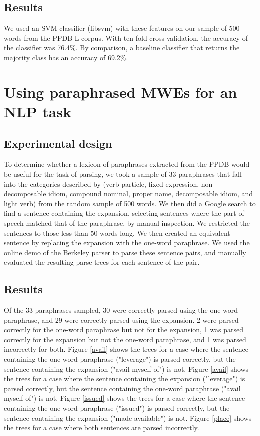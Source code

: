 \documentclass[11pt]{article}
\begin{document}
\subsection{Results}

We used an SVM classifier (libsvm) with these features on our sample of 500 words from the PPDB L corpus. With ten-fold cross-validation, the accuracy of the classifier was 76.4\%. By comparison, a baseline classifier that returns the majority class has an accuracy of 69.2\%. 

\section{Using paraphrased MWEs for an NLP task}

\subsection{Experimental design}

To determine whether a lexicon of paraphrases extracted from the PPDB would be useful for the task of parsing, we took a sample of 33 paraphrases that fall into the categories described by  (verb particle, fixed expression, non-decomposable idiom, compound nominal, proper name, decomposable idiom, and light verb) from the random sample of 500 words. We then did a Google search to find a sentence containing the expansion, selecting sentences where the part of speech matched that of the paraphrase, by manual inspection. We restricted the sentences to those less than 50 words long. We then created an equivalent sentence by replacing the expansion with the one-word paraphrase. We used the online demo of the Berkeley parser \cite{petrov-EtAl:2006:COLACL} to parse these sentence pairs, and manually evaluated the resulting parse trees for each sentence of the pair.

\subsection{Results}

Of the 33 paraphrases sampled, 30 were correctly parsed using the one-word paraphrase, and 29 were correctly parsed using the expansion. 2 were parsed correctly for the one-word paraphrase but not for the expansion, 1 was parsed correctly for the expansion but not the one-word paraphrase, and 1 was parsed incorrectly for both. Figure \ref{avail} shows the trees for a case where the sentence containing the one-word paraphrase ("leverage") is parsed correctly, but the sentence containing the expansion ("avail myself of") is not. Figure \ref{avail} shows the trees for a case where the sentence containing the expansion ("leverage") is parsed correctly, but the sentence containing the one-word paraphrase ("avail myself of") is not. Figure \ref{issued} shows the trees for a case where the sentence containing the one-word paraphrase ("issued") is parsed correctly, but the sentence containing the expansion ("made available") is not. Figure \ref{place} shows the trees for a case where both sentences are parsed incorrectly.
\end{document}

